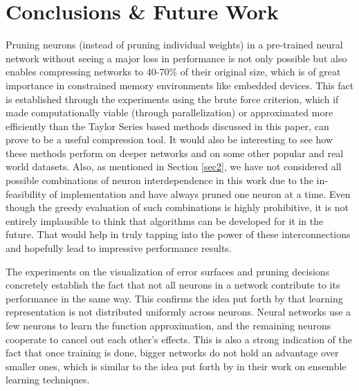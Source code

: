 \section{Conclusions \& Future Work}
Pruning neurons (instead of pruning individual weights) in a pre-trained neural network without seeing a major loss in performance is not only possible but also enables compressing networks to 40-70\% of their original size, which is of great importance in constrained memory environments like embedded devices. This fact is established through the experiments using the brute force criterion, which if made computationally viable (through parallelization) or approximated more efficiently than the Taylor Series based methods discussed in this paper, can prove to be a useful compression tool. It would also be interesting to see how these methods perform on deeper networks and on some other popular and real world datasets. Also, as mentioned in Section \ref{sec2}, we have not considered all possible combinations of neuron interdependence in this work due to the in-feasibility of implementation and have always pruned one neuron at a time. Even though the greedy evaluation of such combinations is highly prohibitive, it is not entirely implausible to think that algorithms can be developed for it in the future. That would help in truly tapping into the power of these interconnections and hopefully lead to impressive performance results.

The experiments on the visualization of error surfaces and pruning decisions concretely establish the fact that not all neurons in a network contribute to its performance in the same way. This confirms the idea put forth by \cite{mozer1989using} that learning representation is not distributed uniformly across neurons. Neural networks use a few neurons to learn the function approximation, and the remaining neurons cooperate to cancel out each other's effects. This is also a strong indication of the fact that once training is done, bigger networks do not hold an advantage over smaller ones, which is similar to the idea put forth by \cite{darkknowledge2015} in their work on ensemble learning techniques.

